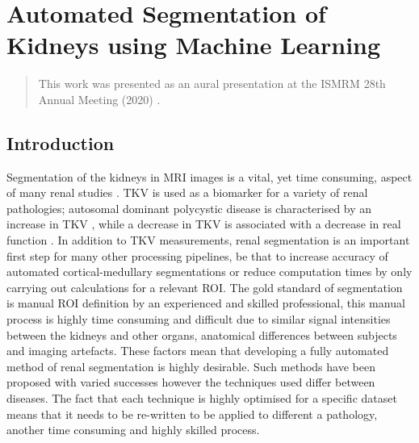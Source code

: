 \chapter{Automated Segmentation of Kidneys using Machine Learning}
\label{chap:ML}

\begin{abstract}
	This work was presented as an aural presentation at the \ac{ISMRM} 28th Annual Meeting (2020) \cite{daniel_automated_2020}.
	
	\lipsum[1]
\end{abstract}
\newpage

\section{Introduction}

Segmentation of the kidneys in \ac{MRI} images is a vital, yet time consuming, aspect of many renal studies \cite{cohen_mri_2009, van_den_dool_functional_2005, cox_multiparametric_2017}. \ac{TKV} is used as a biomarker for a variety of renal pathologies; autosomal dominant polycystic disease is characterised by an increase in \ac{TKV} \cite{chapman_kidney_2012, tangri_total_2017}, while a decrease in \ac{TKV} is associated with a decrease in real function \cite{gong_relationship_2012}. In addition to \ac{TKV} measurements, renal segmentation is an important first step for many other processing pipelines, be that to increase accuracy of automated cortical-medullary segmentations or reduce computation times by only carrying out calculations for a relevant \ac{ROI}. The gold standard of segmentation is manual \ac{ROI} definition by an experienced and skilled professional, this manual process is highly time consuming and difficult due to similar signal intensities between the kidneys and other organs, anatomical differences between subjects and imaging artefacts. These factors mean that developing a fully automated method of renal segmentation is highly desirable. Such methods have been proposed with varied successes \cite{zollner_assessment_2012, seuss_development_2017} however the techniques used differ between diseases. The fact that each technique is highly optimised for a specific dataset means that it needs to be re-written to be applied to different a pathology, another time consuming and highly skilled process.

